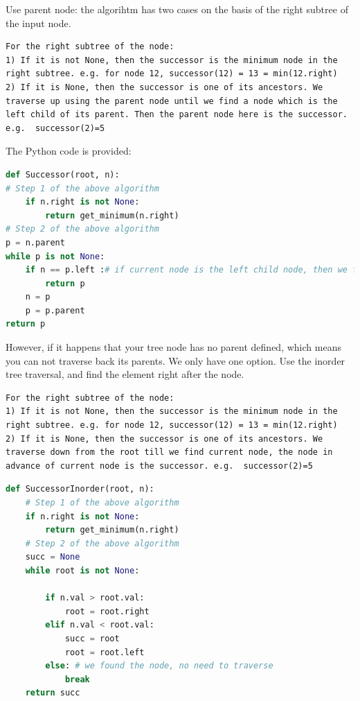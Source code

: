 \documentclass[data-structure.tex]{subfiles}
\begin{document}
Use parent node: the algorihtm has two cases on the basis of the right subtree of the input node. 
\begin{lstlisting}[numbers=none]
For the right subtree of the node:
1) If it is not None, then the successor is the minimum node in the right subtree. e.g. for node 12, successor(12) = 13 = min(12.right)
2) If it is None, then the successor is one of its ancestors. We traverse up using the parent node until we find a node which is the left child of its parent. Then the parent node here is the successor. e.g.  successor(2)=5
\end{lstlisting}
 The Python code is provided:
\begin{lstlisting}[language = Python]
def Successor(root, n):
# Step 1 of the above algorithm
    if n.right is not None:
        return get_minimum(n.right)
# Step 2 of the above algorithm
p = n.parent
while p is not None:
    if n == p.left :# if current node is the left child node, then we found the successor, p
        return p
    n = p
    p = p.parent
return p
\end{lstlisting}
However, if it happens that your tree node has no parent defined, which means you can not traverse back its parents. We only have one option. Use the inorder tree traversal, and find the element right after the node. \begin{lstlisting}[numbers=none]
For the right subtree of the node:
1) If it is not None, then the successor is the minimum node in the right subtree. e.g. for node 12, successor(12) = 13 = min(12.right)
2) If it is None, then the successor is one of its ancestors. We traverse down from the root till we find current node, the node in advance of current node is the successor. e.g.  successor(2)=5
\end{lstlisting}
\begin{lstlisting}[language=Python]
def SuccessorInorder(root, n):
    # Step 1 of the above algorithm
    if n.right is not None:
        return get_minimum(n.right)
    # Step 2 of the above algorithm
    succ = None
    while root is not None:
        
        if n.val > root.val:
            root = root.right
        elif n.val < root.val:
            succ = root
            root = root.left
        else: # we found the node, no need to traverse
            break
    return succ
\end{lstlisting}
\end{document}
